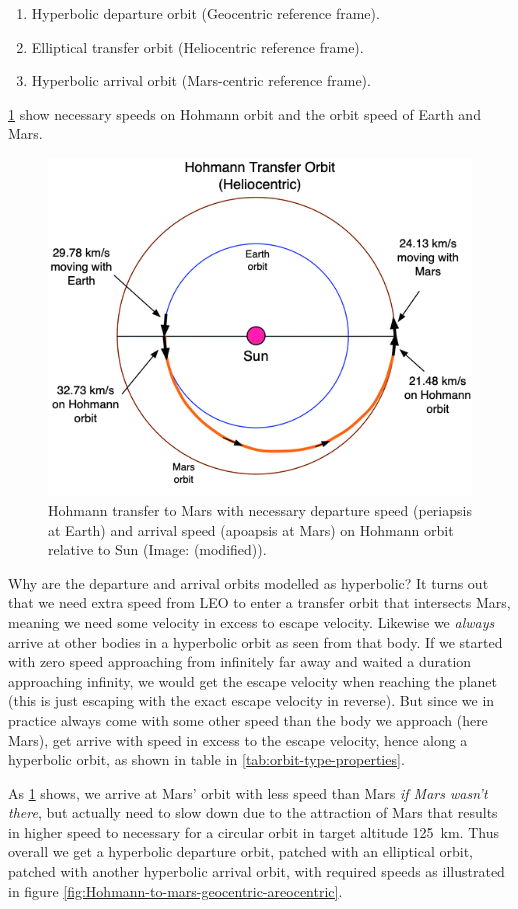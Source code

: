 \begin{enumerate}
	\item Hyperbolic departure orbit (Geocentric reference frame).
	\item Elliptical transfer orbit (Heliocentric reference frame).
	\item Hyperbolic arrival orbit (Mars-centric reference frame).
\end{enumerate}
\cref{fig:Hohmann-to-mars-heliocentric} show necessary speeds on Hohmann orbit and the orbit speed of Earth and Mars. 
\begin{figure}[ht]
    \centering
    \includegraphics[width=0.7\linewidth]{fig/Hohmann-to-mars-heliocentric.png}
    \caption{Hohmann transfer to Mars with necessary departure speed (periapsis at Earth) and arrival speed (apoapsis at Mars) on Hohmann orbit relative to Sun (Image: \cite[p.~127]{Rapp2016} (modified)).}
    \label{fig:Hohmann-to-mars-heliocentric}
\end{figure}
Why are the departure and arrival orbits modelled as hyperbolic? It turns out that we need extra speed from LEO to enter a transfer orbit that intersects Mars, meaning we need some velocity in excess to escape velocity. Likewise we \emph{always} arrive at other bodies in a hyperbolic orbit as seen from that body. If we started with zero speed approaching from infinitely far away and waited a duration approaching infinity, we would get the escape velocity when reaching the planet (this is just escaping with the exact escape velocity in reverse). But since we in practice always come with some other speed than the body we approach (here Mars), get arrive with speed in excess to the escape velocity, hence along a hyperbolic orbit, as shown in table in \cref{tab:orbit-type-properties}.

As \cref{fig:Hohmann-to-mars-heliocentric} shows, we arrive at Mars' orbit with less speed than Mars \emph{if Mars wasn't there}, but actually need to slow down due to the attraction of Mars that results in higher speed to necessary for a circular orbit in target altitude \SI{125}{\km}. Thus overall we get a hyperbolic departure orbit, patched with an elliptical orbit, patched with another hyperbolic arrival orbit, with required speeds as illustrated in figure \cref{fig:Hohmann-to-mars-geocentric-areocentric}.

